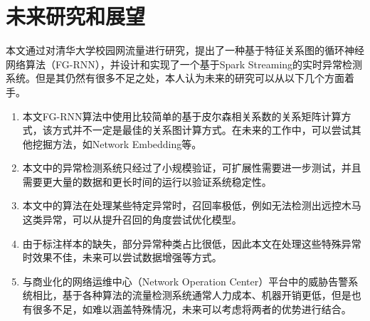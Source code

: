 \section{未来研究和展望}
本文通过对清华大学校园网流量进行研究，提出了一种基于特征关系图的循环神经网络算法（FG-RNN），并设计和实现了一个基于Spark Streaming的实时异常检测系统。但是其仍然有很多不足之处，本人认为未来的研究可以从以下几个方面着手。
\begin{enumerate}
    \item 本文FG-RNN算法中使用比较简单的基于皮尔森相关系数的关系矩阵计算方式，该方式并不一定是最佳的关系图计算方式。在未来的工作中，可以尝试其他挖掘方法，如Network Embedding等。
    \item 本文中的异常检测系统只经过了小规模验证，可扩展性需要进一步测试，并且需要更大量的数据和更长时间的运行以验证系统稳定性。
    \item 本文中的算法在处理某些特定异常时，召回率极低，例如无法检测出远控木马这类异常，可以从提升召回的角度尝试优化模型。
    \item 由于标注样本的缺失，部分异常种类占比很低，因此本文在处理这些特殊异常时效果不佳，未来可以尝试数据增强等方式。
    \item 与商业化的网络运维中心（Network Operation Center）平台中的威胁告警系统相比，基于各种算法的流量检测系统通常人力成本、机器开销更低，但是也有很多不足，如难以涵盖特殊情况，未来可以考虑将两者的优势进行结合。
\end{enumerate}

